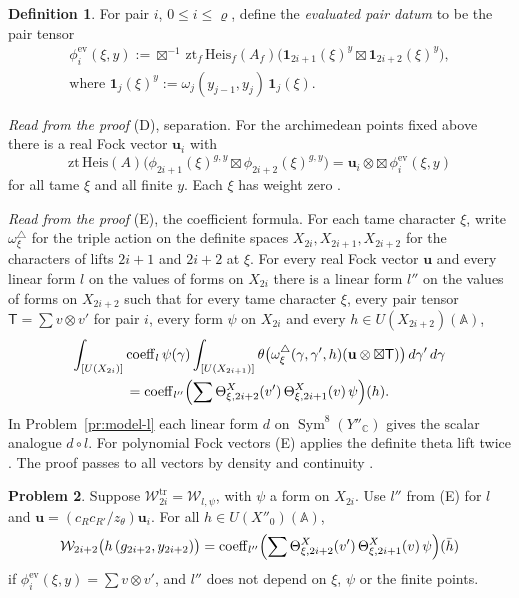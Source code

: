 \documentclass[reqno]{amsart}
\theoremstyle{definition}
\newtheorem{problem}{Problem}[section]
\newtheorem{definition}[problem]{Definition}
\theoremstyle{plain}
\theoremstyle{remark}
\newcommand{\A}{\mathbb{A}}
\newcommand{\Wc}{\mathcal{W}}
\newcommand{\C}{\mathbb{C}}
\newcommand{\Sym}{\operatorname{Sym}}
\newcommand{\Heis}{\mathrm{Heis}}
\newcommand{\zt}{\mathrm{zt}}
\newcommand{\ev}{\mathrm{ev}}
\newcommand{\coeff}{\operatorname{coeff}}
\newcommand{\Wtr}{\Wc^{\mathrm{tr}}}
\newcommand{\bu}{\mathbf u}
\begin{document}
\begin{definition}\label{def:evaluated}
For pair \(i\), \(0\le i\le\varrho\), define the \emph{evaluated pair datum} to be the pair tensor
\begin{gather*}
  \phi^{\ev}_i(\xi, y) := \boxtimes^{-1}\,\zt_f\,\Heis_f(A_f)\bigl(\mathbf 1_{2i+1}(\xi)^y \boxtimes \mathbf 1_{2i+2}(\xi)^y\bigr), \\
\text{where } \mathbf 1_j(\xi)^y := \omega_j(y_{j-1}, y_j)\,\mathbf 1_j(\xi) .
\end{gather*}

\end{definition}

\emph{Read from the proof} (D), separation.  For the archimedean points fixed above there is a real Fock vector \(\bu_i\) with
\[
  \zt\,\Heis(A)\bigl(\phi_{2i+1}(\xi)^{g,y} \boxtimes \phi_{2i+2}(\xi)^{g,y}\bigr) = \bu_i \otimes {\boxtimes}\,\phi^{\ev}_i(\xi, y)
\]
for all tame \(\xi\) and all finite \(y\).  Each \(\xi\) has weight zero \cite[LevelAndTwists, line 268]{GL}.

\emph{Read from the proof} (E), the coefficient formula.  For each tame character \(\xi\), write \(\omega^\triangle_\xi\) for the triple action on the definite spaces \(X_{2i},X_{2i+1},X_{2i+2}\) for the characters of lifts \(2i+1\) and \(2i+2\) at \(\xi\).  For every real Fock vector \(\bu\) and every linear form \(l\) on the values of forms on \(X_{2i}\) there is a linear form \(l''\) on the values of forms on \(X_{2i+2}\) such that for every tame character \(\xi\), every pair tensor \(\mathsf T = \sum v \otimes v'\) for pair \(i\), every form \(\psi\) on \(X_{2i}\) and every \(h \in U(X_{2i+2})(\A)\),
\begin{multline*}
  \int_{[U(X_{2i})]} \coeff_l\psi(\gamma) \int_{[U(X_{2i+1})]} \theta\bigl(\omega^\triangle_\xi(\gamma, \gamma', h)(\bu \otimes {\boxtimes}\mathsf T)\bigr)\,d\gamma'\,d\gamma \\
  = \coeff_{l''}\Bigl(\sum \Theta^X_{\xi,2i+2}(v')\,\Theta^X_{\xi,2i+1}(v)\,\psi\Bigr)(h) .
\end{multline*}
In Problem~\ref{pr:model-l} each linear form \(d\) on \(\Sym^8(Y''_\C)\) gives the scalar analogue \(d\circ l\).  For polynomial Fock vectors (E) applies the definite theta lift twice \cite{Gr,KV,Ho}.  The proof passes to all vectors by density and continuity \cite[UnfoldingStages, lines 157--231]{GL}.

\begin{problem}\label{pr:pair-step}
Suppose \(\Wtr_{2i}=\Wc_{l,\psi}\), with \(\psi\) a form on \(X_{2i}\).  Use \(l''\) from (E) for \(l\) and \(\bu=(c_Rc_{R'}/z_\theta)\bu_i\).  For all \(h\in U(X''_0)(\A)\),
\[
  \Wc_{2i+2}\bigl(h\,(g_{2i+2}, y_{2i+2})\bigr) = \coeff_{l''}\Bigl(\sum\Theta^X_{\xi,2i+2}(v')\,\Theta^X_{\xi,2i+1}(v)\,\psi\Bigr)(\bar h)
\]
if \(\phi^{\ev}_i(\xi, y) = \sum v \otimes v'\), and \(l''\) does not depend on \(\xi\), \(\psi\) or the finite points.
\end{problem}
\end{document}
